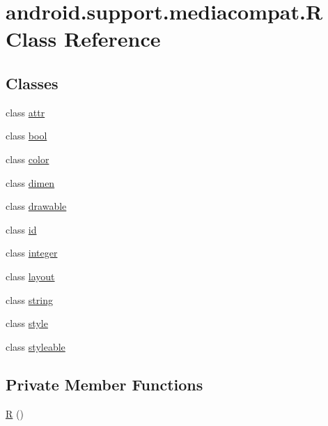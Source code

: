 \hypertarget{classandroid_1_1support_1_1mediacompat_1_1_r}{}\section{android.\+support.\+mediacompat.\+R Class Reference}
\label{classandroid_1_1support_1_1mediacompat_1_1_r}
\subsection*{Classes}
\begin{DoxyCompactItemize}
\item 
class \mbox{\hyperlink{classandroid_1_1support_1_1mediacompat_1_1_r_1_1attr}{attr}}
\item 
class \mbox{\hyperlink{classandroid_1_1support_1_1mediacompat_1_1_r_1_1bool}{bool}}
\item 
class \mbox{\hyperlink{classandroid_1_1support_1_1mediacompat_1_1_r_1_1color}{color}}
\item 
class \mbox{\hyperlink{classandroid_1_1support_1_1mediacompat_1_1_r_1_1dimen}{dimen}}
\item 
class \mbox{\hyperlink{classandroid_1_1support_1_1mediacompat_1_1_r_1_1drawable}{drawable}}
\item 
class \mbox{\hyperlink{classandroid_1_1support_1_1mediacompat_1_1_r_1_1id}{id}}
\item 
class \mbox{\hyperlink{classandroid_1_1support_1_1mediacompat_1_1_r_1_1integer}{integer}}
\item 
class \mbox{\hyperlink{classandroid_1_1support_1_1mediacompat_1_1_r_1_1layout}{layout}}
\item 
class \mbox{\hyperlink{classandroid_1_1support_1_1mediacompat_1_1_r_1_1string}{string}}
\item 
class \mbox{\hyperlink{classandroid_1_1support_1_1mediacompat_1_1_r_1_1style}{style}}
\item 
class \mbox{\hyperlink{classandroid_1_1support_1_1mediacompat_1_1_r_1_1styleable}{styleable}}
\end{DoxyCompactItemize}
\subsection*{Private Member Functions}
\begin{DoxyCompactItemize}
\item 
\mbox{\hyperlink{classandroid_1_1support_1_1mediacompat_1_1_r_a57c7ac186b73e61e21481806c097f290}{R}} ()
\end{DoxyCompactItemize}


